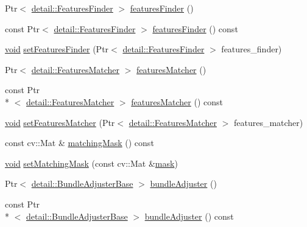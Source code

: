 \begin{DoxyCompactItemize}
\item 
Ptr$<$ \hyperlink{classcv_1_1detail_1_1FeaturesFinder}{detail\-::\-Features\-Finder} $>$ \hyperlink{classcv_1_1Stitcher_aa724ae80a2962ead6b1c3e5a8eaa0c07}{features\-Finder} ()
\item 
const Ptr$<$ \hyperlink{classcv_1_1detail_1_1FeaturesFinder}{detail\-::\-Features\-Finder} $>$ \hyperlink{classcv_1_1Stitcher_a2daf0589703d125d3e2836f532c5b5bb}{features\-Finder} () const 
\item 
\hyperlink{legacy_8hpp_a8bb47f092d473522721002c86c13b94e}{void} \hyperlink{classcv_1_1Stitcher_ae7cd5967c7a89cb743b07e9eac8a7ae5}{set\-Features\-Finder} (Ptr$<$ \hyperlink{classcv_1_1detail_1_1FeaturesFinder}{detail\-::\-Features\-Finder} $>$ features\-\_\-finder)
\item 
Ptr$<$ \hyperlink{classcv_1_1detail_1_1FeaturesMatcher}{detail\-::\-Features\-Matcher} $>$ \hyperlink{classcv_1_1Stitcher_a426a576f1e2c12d9d5437a86625564c0}{features\-Matcher} ()
\item 
const Ptr\\*
$<$ \hyperlink{classcv_1_1detail_1_1FeaturesMatcher}{detail\-::\-Features\-Matcher} $>$ \hyperlink{classcv_1_1Stitcher_a376ec137ac871e80a3de108736c80f70}{features\-Matcher} () const 
\item 
\hyperlink{legacy_8hpp_a8bb47f092d473522721002c86c13b94e}{void} \hyperlink{classcv_1_1Stitcher_ada7fb8b0e696bfe3104f73d07ab0b5c4}{set\-Features\-Matcher} (Ptr$<$ \hyperlink{classcv_1_1detail_1_1FeaturesMatcher}{detail\-::\-Features\-Matcher} $>$ features\-\_\-matcher)
\item 
const cv\-::\-Mat \& \hyperlink{classcv_1_1Stitcher_a21953347e8a9844d8e44f68c6d0d7ac0}{matching\-Mask} () const 
\item 
\hyperlink{legacy_8hpp_a8bb47f092d473522721002c86c13b94e}{void} \hyperlink{classcv_1_1Stitcher_a5a7d92f2dd21710134fbe09a4e9cf8ff}{set\-Matching\-Mask} (const cv\-::\-Mat \&\hyperlink{tracking_8hpp_a6b13ecd2fd6ec7ad422f1d7863c3ad19}{mask})
\item 
Ptr$<$ \hyperlink{classcv_1_1detail_1_1BundleAdjusterBase}{detail\-::\-Bundle\-Adjuster\-Base} $>$ \hyperlink{classcv_1_1Stitcher_a3afc54727bdd855bad04613f7e337a89}{bundle\-Adjuster} ()
\item 
const Ptr\\*
$<$ \hyperlink{classcv_1_1detail_1_1BundleAdjusterBase}{detail\-::\-Bundle\-Adjuster\-Base} $>$ \hyperlink{classcv_1_1Stitcher_adf4506ab7d936d743e3f71c45767ac5d}{bundle\-Adjuster} () const 
\item 

\end{DoxyCompactItemize}
